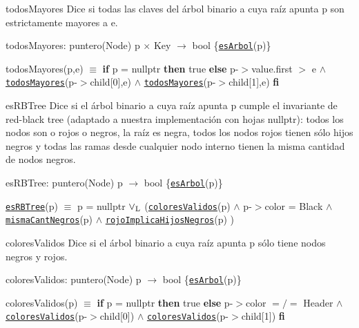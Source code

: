 \begin{DoxyParagraph}{todos\-Mayores}
Dice si todas las claves del árbol binario a cuya raíz apunta p son estrictamente mayores a e.

todos\-Mayores\-: puntero(\-Node) p $\times$ Key $\to$ bool \{\href{axiomas.html#esArbol}{\tt es\-Arbol}(p)\} \par
todos\-Mayores(p,e) $\equiv$ {\bfseries if} p = nullptr {\bfseries then} true {\bfseries else} p-\/$>$value.\-first $>$ e $\land$ \href{axiomas.html#todosMayores}{\tt todos\-Mayores}(p-\/$>$child\mbox{[}0\mbox{]},e) $\land$ \href{axiomas.html#todosMayores}{\tt todos\-Mayores}(p-\/$>$child\mbox{[}1\mbox{]},e) {\bfseries fi} 


\end{DoxyParagraph}
\begin{DoxyParagraph}{es\-R\-B\-Tree}
Dice si el árbol binario a cuya raíz apunta p cumple el invariante de red-\/black tree (adaptado a nuestra implementación con hojas nullptr)\-: todos los nodos son o rojos o negros, la raíz es negra, todos los nodos rojos tienen sólo hijos negros y todas las ramas desde cualquier nodo interno tienen la misma cantidad de nodos negros.

es\-R\-B\-Tree\-: puntero(\-Node) p $\to$ bool \{\href{axiomas.html#esArbol}{\tt es\-Arbol}(p)\} \par
\href{axiomas.html#esRBTree}{\tt es\-R\-B\-Tree}(p) $\equiv$ p = nullptr $\lor_{\rm L}$ (\href{axiomas.html#coloresValidos}{\tt colores\-Validos}(p) $\land$ p-\/$>$color = Black $\land$ \href{axiomas.html#mismaCantNegros}{\tt misma\-Cant\-Negros}(p) $\land$ \href{axiomas.html#rojoImplicaHijosNegros}{\tt rojo\-Implica\-Hijos\-Negros}(p) )


\end{DoxyParagraph}
\begin{DoxyParagraph}{colores\-Validos}
Dice si el árbol binario a cuya raíz apunta p sólo tiene nodos negros y rojos.

colores\-Validos\-: puntero(\-Node) p $\to$ bool \{\href{axiomas.html#esArbol}{\tt es\-Arbol}(p)\} \par
colores\-Validos(p) $\equiv$ {\bfseries if} p = nullptr {\bfseries then} true {\bfseries else} p-\/$>$color $=/=$ Header $\land$ \href{axiomas.html#coloresValidos}{\tt colores\-Validos}(p-\/$>$child\mbox{[}0\mbox{]}) $\land$ \href{axiomas.html#coloresValidos}{\tt colores\-Validos}(p-\/$>$child\mbox{[}1\mbox{]}) {\bfseries fi} 


\end{DoxyParagraph}
